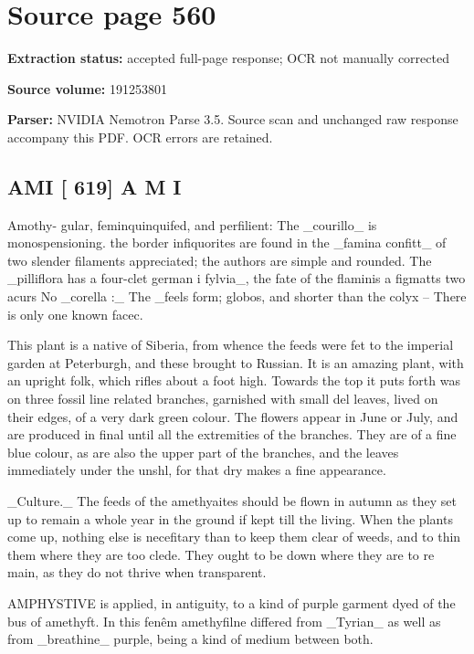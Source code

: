 \clearpage
\section{Source page 560}
\textbf{Extraction status:} accepted full-page response; OCR not manually corrected\par
\textbf{Source volume:} 191253801\par
\textbf{Parser:} NVIDIA Nemotron Parse 3.5. Source scan and unchanged raw response accompany this PDF. OCR errors are retained.\par\medskip
\subsection*{AMI [ 619] A M I}
Amothy- gular, feminquinquifed, and perfilient: The \_courillo\_ is monospensioning. the border infiquorites are found in the \_famina confitt\_ of two slender filaments appreciated; the authors are simple and rounded. The \_pilliflora has a four-clet german i fylvia\_, the fate of the flaminis a figmatts two acurs No \_corella :\_ The \_feels form; globos, and shorter than the colyx – There is only one known facec.\par\medskip
This plant is a native of Siberia, from whence the feeds were fet to the imperial garden at Peterburgh, and these brought to Russian. It is an amazing plant, with an upright folk, which rifles about a foot high. Towards the top it puts forth was on three fossil line related branches, garnished with small del leaves, lived on their edges, of a very dark green colour. The flowers appear in June or July, and are produced in final until all the extremities of the branches. They are of a fine blue colour, as are also the upper part of the branches, and the leaves immediately under the unshl, for that dry makes a fine appearance.\par\medskip
\_Culture.\_ The feeds of the amethyaites should be flown in autumn as they set up to remain a whole year in the ground if kept till the living. When the plants come up, nothing else is necefitary than to keep them clear of weeds, and to thin them where they are too clede. They ought to be down where they are to re main, as they do not thrive when transparent.\par\medskip
AMPHYSTIVE is applied, in antiguity, to a kind of purple garment dyed of the bus of amethyft. In this fenêm amethyfilne differed from \_Tyrian\_ as well as from \_breathine\_ purple, being a kind of medium between both.\par\medskip

